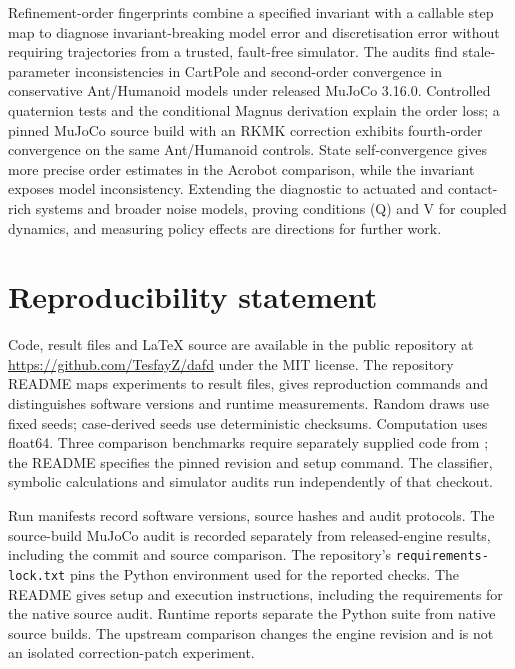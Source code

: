 \documentclass[10pt]{article}
\theoremstyle{definition}
\begin{document}
Refinement-order fingerprints combine a specified invariant with a callable
step map to diagnose invariant-breaking model error and discretisation error
without requiring trajectories from a trusted, fault-free simulator. The audits find stale-parameter
inconsistencies in CartPole and second-order convergence in conservative
Ant/Humanoid models under released MuJoCo 3.16.0. Controlled quaternion tests
and the conditional Magnus derivation explain the order loss; a pinned MuJoCo
source build with an RKMK correction exhibits fourth-order convergence on the
same Ant/Humanoid controls. State self-convergence gives more precise order
estimates in the Acrobot comparison, while the invariant exposes model
inconsistency. Extending the diagnostic to actuated and contact-rich systems
and broader noise models, proving conditions (Q) and V for coupled dynamics,
and measuring policy effects are directions for further work.

\section*{Reproducibility statement}

Code, result files and \LaTeX{} source are available in the public repository
at \url{https://github.com/TesfayZ/dafd} under the MIT license.
The repository README maps experiments to result files,
gives reproduction commands and distinguishes software versions and runtime
measurements. Random draws use fixed seeds; case-derived seeds use deterministic
checksums. Computation uses float64. Three comparison benchmarks require
separately supplied code from \citet{gebrekidan2026diagnosing};
the README specifies the pinned revision and setup command. The classifier,
symbolic calculations and simulator audits run independently of that checkout.

Run manifests record software versions, source hashes and audit protocols. The
source-build MuJoCo audit is recorded separately from released-engine results,
including the commit and source comparison. The repository's
\texttt{requirements-lock.txt} pins the Python environment used for the
reported checks. The README gives setup and execution instructions, including
the requirements for the native source audit. Runtime reports separate the
Python suite from native source builds. The upstream comparison changes the engine revision
and is not an isolated correction-patch experiment.
\end{document}
